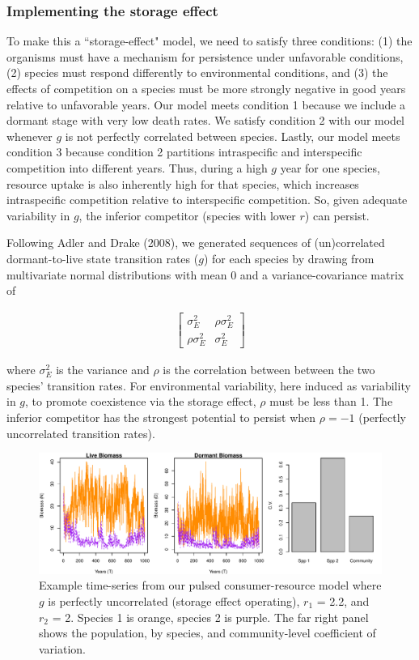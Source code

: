 \documentclass[12pt]{article}
\begin{document}
\subsubsection{Implementing the storage effect}
To make this a ``storage-effect" model, we need to satisfy three conditions: (1) the organisms must have a mechanism for persistence under unfavorable conditions, (2) species must respond differently to environmental conditions, and (3) the effects of competition on a species must be more strongly negative in good years relative to unfavorable years. Our model meets condition 1 because we include a dormant stage with very low death rates. We satisfy condition 2 with our model whenever $g$ is not perfectly correlated between species. Lastly, our model meets condition 3 because condition 2 partitions intraspecific and interspecific competition into different years. Thus, during a high $g$ year for one species, resource uptake is also inherently high for that species, which increases intraspecific competition relative to interspecific competition. So, given adequate variability in $g$, the inferior competitor (species with lower $r$) can persist. 

Following Adler and Drake (2008), we generated sequences of (un)correlated dormant-to-live state transition rates ($g$) for each species by drawing from multivariate normal distributions with mean 0 and a variance-covariance matrix of

\begin{align}
\begin{bmatrix}
\sigma^2_{E} & \rho\sigma^2_{E} \\
\rho\sigma^2_{E} & \sigma^2_{E}
\end{bmatrix}
\end{align}

\noindent{}where $\sigma^2_{E}$ is the variance and $\rho$ is the correlation between between the two species' transition rates. For environmental variability, here induced as variability in $g$, to promote coexistence via the storage effect, $\rho$ must be less than 1. The inferior competitor has the strongest potential to persist when $\rho=-1$ (perfectly uncorrelated transition rates). 

\begin{figure}
\begin{center}
\includegraphics{Fig-001}
\end{center}
\caption{Example time-series from our pulsed consumer-resource model where $g$ is perfectly uncorrelated (storage effect operating), $r_1$ = 2.2, and $r_2$ = 2. Species 1 is orange, species 2 is purple. The far right panel shows the population, by species, and community-level coefficient of variation.}
\end{figure}
\end{document}

